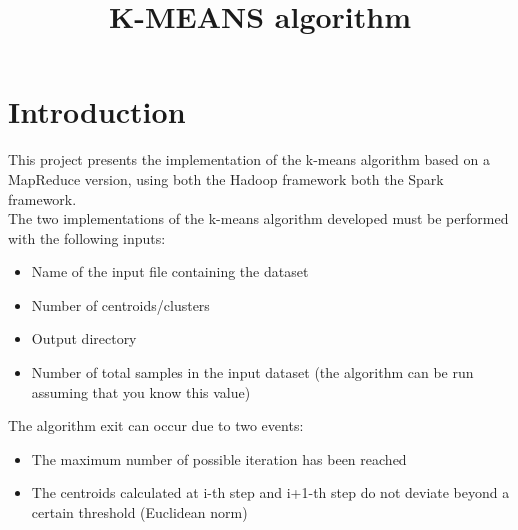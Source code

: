 \documentclass[a4paper, oneside]{article}
\begin{document}
\baselineskip 13pt

\begin{frontespizio} 
 \Preambolo{\renewcommand{\frontpretitlefont}{\fontsize{15}{12}\scshape}}
\Rientro {1cm}
 \Punteggiatura {}
\end{frontespizio}

\clearpage

\tableofcontents\thispagestyle{empty}
\clearpage

\title{K-MEANS algorithm}

\section{Introduction}
This project presents the implementation of the k-means algorithm based on a MapReduce version, using both the Hadoop framework both the Spark framework.\\
The two implementations of the k-means algorithm developed must be performed with the following inputs:
\begin{itemize}
\item Name of the input file containing the dataset
\item Number of centroids/clusters
\item Output directory
\item Number of total samples in the input dataset (the algorithm can be run assuming that you know this value)
\end{itemize}
\vspace{4mm}
The algorithm exit can occur due to two events:
\begin{itemize}
\item The maximum number of possible iteration has been reached 
\item The centroids calculated at i-th step and i+1-th step do not deviate beyond a certain threshold (Euclidean norm)
\end{itemize}
\end{document}
